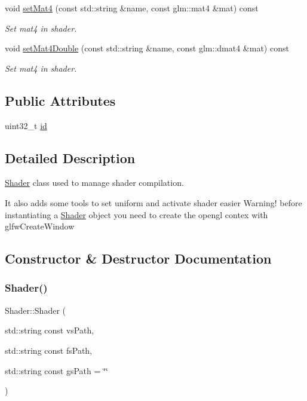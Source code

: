 \begin{DoxyCompactItemize}
void \hyperlink{class_shader_a8e711c96f3e1722cbfb88fde9478977c}{set\+Mat4} (const std\+::string \&name, const glm\+::mat4 \&mat) const
\begin{DoxyCompactList}\small\item\em Set mat4 in shader. \end{DoxyCompactList}\item 
void \hyperlink{class_shader_a68b9ec9f32795c0f4d8e4b5a71bfb11f}{set\+Mat4\+Double} (const std\+::string \&name, const glm\+::dmat4 \&mat) const
\begin{DoxyCompactList}\small\item\em Set mat4 in shader. \end{DoxyCompactList}\end{DoxyCompactItemize}
\subsection*{Public Attributes}
\begin{DoxyCompactItemize}
\item 
uint32\+\_\+t \hyperlink{class_shader_af4508ba23f3f3c9a38791bce60dc08dc}{id}
\end{DoxyCompactItemize}


\subsection{Detailed Description}
\hyperlink{class_shader}{Shader} class used to manage shader compilation. 

It also adds some tools to set uniform and activate shader easier Warning! before instantiating a \hyperlink{class_shader}{Shader} object you need to create the opengl contex with glfw\+Create\+Window 

\subsection{Constructor \& Destructor Documentation}
\mbox{\label{class_shader_af52cfbd48a8697db80c29647d26591d8}} 
\subsubsection{\texorpdfstring{Shader()}{Shader()}\hspace{0.1cm}{\footnotesize\ttfamily [1/2]}}
{\footnotesize\ttfamily Shader\+::\+Shader (\begin{DoxyParamCaption}\item[{std\+::string const}]{vs\+Path,  }\item[{std\+::string const}]{fs\+Path,  }\item[{std\+::string const}]{gs\+Path = {\ttfamily \char`\"{}\char`\"{}} }\end{DoxyParamCaption})}



